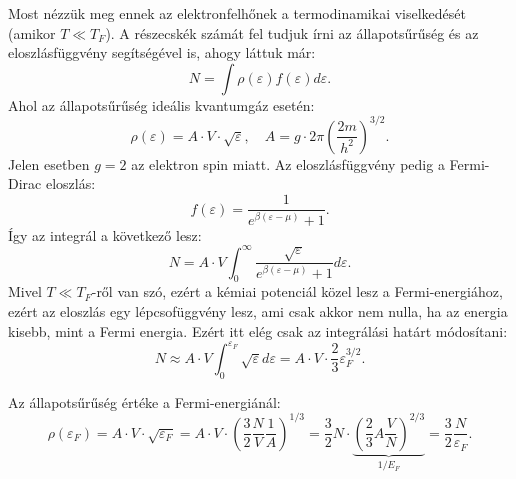 \documentclass[../main.tex]{subfiles}
\begin{document}
Most nézzük meg ennek az elektronfelhőnek a termodinamikai viselkedését (amikor $T \ll T_F$). A részecskék számát fel tudjuk írni az állapotsűrűség és az eloszlásfüggvény segítségével is, ahogy láttuk már:
\begin{equation}
    N = \int \rho(\varepsilon) f(\varepsilon) d\varepsilon.
\end{equation}
Ahol az állapotsűrűség ideális kvantumgáz esetén:
\begin{equation}
    \rho(\varepsilon) = A \cdot V \cdot \sqrt{\varepsilon}, \quad A = g \cdot 2 \pi \left( \frac{2m}{h^2} \right)^{3/2}.
\end{equation}
Jelen esetben $g=2$ az elektron spin miatt. Az eloszlásfüggvény pedig a Fermi-Dirac eloszlás:
\begin{equation}
    f(\varepsilon) = \frac{1}{e^{\beta (\varepsilon - \mu)} + 1}.
\end{equation}
Így az integrál a következő lesz:
\begin{equation}
    N = A \cdot V \int_0^{\infty} \frac{\sqrt{\varepsilon}}{e^{\beta (\varepsilon - \mu)} + 1} d\varepsilon.
\end{equation}
Mivel $T \ll T_F$-ről van szó, ezért a kémiai potenciál közel lesz a Fermi-energiához, ezért az eloszlás egy lépcsofüggvény lesz, ami csak akkor nem nulla, ha az energia kisebb, mint a Fermi energia. 
Ezért itt elég csak az integrálási határt módosítani:
\begin{equation}
    N \approx A \cdot V \int_0^{\varepsilon_F} \sqrt{\varepsilon} d\varepsilon = A \cdot V \cdot \frac{2}{3} \varepsilon^{3/2}_F.
\end{equation}

Az állapotsűrűség értéke a Fermi-energiánál:
\begin{equation}
    \rho(\varepsilon_F) = A \cdot V \cdot \sqrt{\varepsilon_F} = A \cdot V \cdot \left(\frac{3}{2} \frac{N}{V} \frac{1}{A}\right)^{1/3} = \frac{3}{2} N \cdot \underbrace{\left(\frac{2}{3}A\frac{V}{N}\right)^{2/3}}_{1/E_F} = \frac{3}{2} \frac{N}{\varepsilon_F}.
\end{equation}
\end{document}

